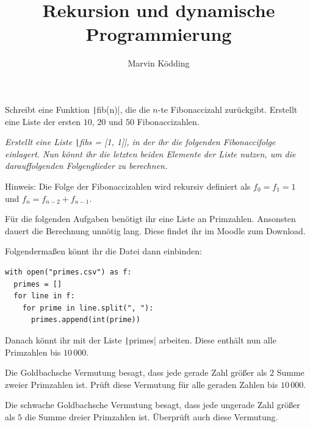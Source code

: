 \documentclass[a4paper, 12pt]{cssheet}
\title{Rekursion und dynamische Programmierung}
\author{Marvin Ködding}
\begin{document}
	\printtitle
	
	\vspace*{.5cm}
	
	\begin{aufgabe}
		Schreibt eine Funktion \texttt|fib(n)|, die die $n$-te Fibonaccizahl zurückgibt. Erstellt eine Liste der ersten $10$, $20$ und $50$ Fibonaccizahlen.
		
		\it Erstellt eine Liste \texttt|fibs = [1, 1]|, in der ihr die folgenden Fibonaccifolge einlagert. Nun könnt ihr die letzten beiden Elemente der Liste nutzen, um die darauffolgenden Folgenglieder zu berechnen.
		
		\small Hinweis: Die Folge der Fibonaccizahlen wird rekursiv definiert als $f_0 = f_1 = 1$ und $f_n = f_{n-2} + f_{n-1}$. 
	\end{aufgabe}
	
	Für die folgenden Aufgaben benötigt ihr eine Liste an Primzahlen. Ansonsten dauert die Berechnung unnötig lang. Diese findet ihr im Moodle zum Download.
	
	Folgendermaßen könnt ihr die Datei dann einbinden:
	
	\begin{verbatim}
with open("primes.csv") as f:
  primes = []
  for line in f:
    for prime in line.split(", "):
      primes.append(int(prime))
	\end{verbatim}
	
	Danach könnt ihr mit der Liste \texttt|primes| arbeiten. Diese enthält nun alle Primzahlen bis $10\,000$.
	
	\begin{aufgabe}
		Die Goldbachsche Vermutung besagt, dass jede gerade Zahl größer als $2$ Summe zweier Primzahlen ist. Prüft diese Vermutung für alle geraden Zahlen bis $10\,000$. 
	\end{aufgabe}
	
	\begin{aufgabe}
		Die schwache Goldbachsche Vermutung besagt, dass jede ungerade Zahl größer als $5$ die Summe dreier Primzahlen ist. Überprüft auch diese Vermutung. 
	\end{aufgabe}
	
\end{document}
